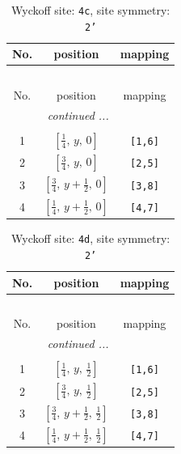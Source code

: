 \documentclass[fleqn,8pt]{jsarticle}
\begin{document}
\renewcommand{\arraystretch}{1.2}
\begin{longtable}{ccc}
\caption{Wyckoff site: {\tt 4c}, site symmetry: {\tt 2'}}
 \\
 \hline \hline
No. & position & mapping \\ \hline \endfirsthead

\multicolumn{2}{l}{\tablename\ \thetable{}} \\
 \hline \hline
No. & position & mapping \\ \hline \endhead

 \hline \hline
\multicolumn{2}{r}{\footnotesize\it continued ...} \\ \endfoot

 \hline \hline
\multicolumn{2}{r}{} \\ \endlastfoot

1 & $\left[ \frac{1}{4},\, y,\, 0 \right]$ & {\tt [1,6]} \\ \hline
2 & $\left[ \frac{3}{4},\, y,\, 0 \right]$ & {\tt [2,5]} \\ \hline
3 & $\left[ \frac{3}{4},\, y + \frac{1}{2},\, 0 \right]$ & {\tt [3,8]} \\ \hline
4 & $\left[ \frac{1}{4},\, y + \frac{1}{2},\, 0 \right]$ & {\tt [4,7]} \\
\end{longtable}
\renewcommand{\arraystretch}{1.2}
\begin{longtable}{ccc}
\caption{Wyckoff site: {\tt 4d}, site symmetry: {\tt 2'}}
 \\
 \hline \hline
No. & position & mapping \\ \hline \endfirsthead

\multicolumn{2}{l}{\tablename\ \thetable{}} \\
 \hline \hline
No. & position & mapping \\ \hline \endhead

 \hline \hline
\multicolumn{2}{r}{\footnotesize\it continued ...} \\ \endfoot

 \hline \hline
\multicolumn{2}{r}{} \\ \endlastfoot

1 & $\left[ \frac{1}{4},\, y,\, \frac{1}{2} \right]$ & {\tt [1,6]} \\ \hline
2 & $\left[ \frac{3}{4},\, y,\, \frac{1}{2} \right]$ & {\tt [2,5]} \\ \hline
3 & $\left[ \frac{3}{4},\, y + \frac{1}{2},\, \frac{1}{2} \right]$ & {\tt [3,8]} \\ \hline
4 & $\left[ \frac{1}{4},\, y + \frac{1}{2},\, \frac{1}{2} \right]$ & {\tt [4,7]} \\
\end{longtable}
\end{document}
